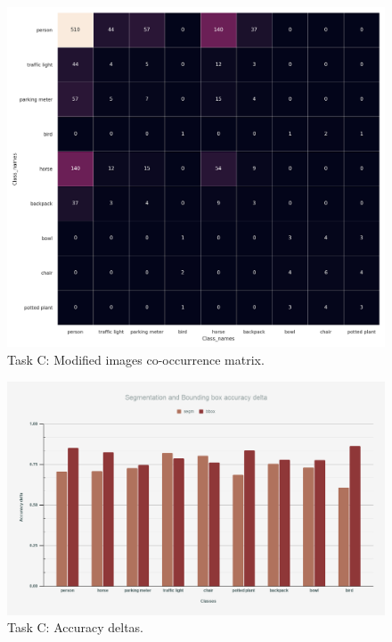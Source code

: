 \documentclass[11pt,a4paper,twocolumn,twoside]{article}
\begin{document}
\begin{figure}[hbt]
    \includegraphics[width=\textwidth,height=\textheight,keepaspectratio]{Resources/Images/task_c_mods_.png}
    \caption{Task C: Modified images co-occurrence matrix.}
    \label{fig:task_c_mod}
\end{figure}

\begin{figure}[hbt]
    \includegraphics[width=\textwidth,height=\textheight,keepaspectratio]{Resources/Images/task_c_deltas.png}
    \caption{Task C: Accuracy deltas.}
    \label{fig:task_c_deltas}
\end{figure}
\end{document}
